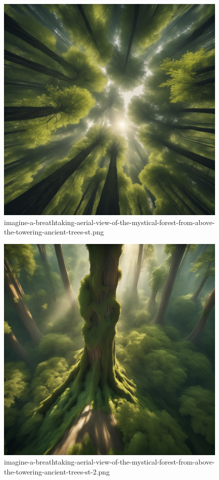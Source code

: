 \begin{figure}
\centering
\includegraphics{imagine-a-breathtaking-aerial-view-of-the-mystical-forest-from-above-the-towering-ancient-trees-st.png}
\caption{imagine-a-breathtaking-aerial-view-of-the-mystical-forest-from-above-the-towering-ancient-trees-st.png}
\end{figure}

\begin{figure}
\centering
\includegraphics{imagine-a-breathtaking-aerial-view-of-the-mystical-forest-from-above-the-towering-ancient-trees-st-2.png}
\caption{imagine-a-breathtaking-aerial-view-of-the-mystical-forest-from-above-the-towering-ancient-trees-st-2.png}
\end{figure}

